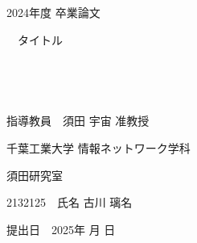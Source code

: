 \documentclass[12pt,a4j,titlepage]{ltjsarticle}
\begin{document}
\begin{titlepage}
  \begin{center}
  
    \vspace*{20truept}
    
    {\LARGE 2024年度 卒業論文} 
    
    \vspace*{75truept}
    
    {\Huge 　タイトル}　%

    \vspace{10truept}

    {\Huge }　%

    \vspace{10truept}

    {\Huge }　%

    \vspace{85truept}
    
    {\LARGE 指導教員　須田 宇宙 准教授}
    
    \vspace{60truept}
    
    {\LARGE 千葉工業大学 情報ネットワーク学科}
    
    \vspace{15truept}
    
    {\LARGE 須田研究室}
    
    \vspace{70truept}
    
    {\LARGE 2132125　氏名 古川 璃名 }　%

    \vspace{70truept}
    
  \end{center}
  \begin{flushright}

    {\LARGE 提出日　2025年 月 日}
  
  \end{flushright}
\end{titlepage}

\setcounter{tocdepth}{3}
\tableofcontents
\listoftables
\listoffigures
\clearpage
\end{document}
